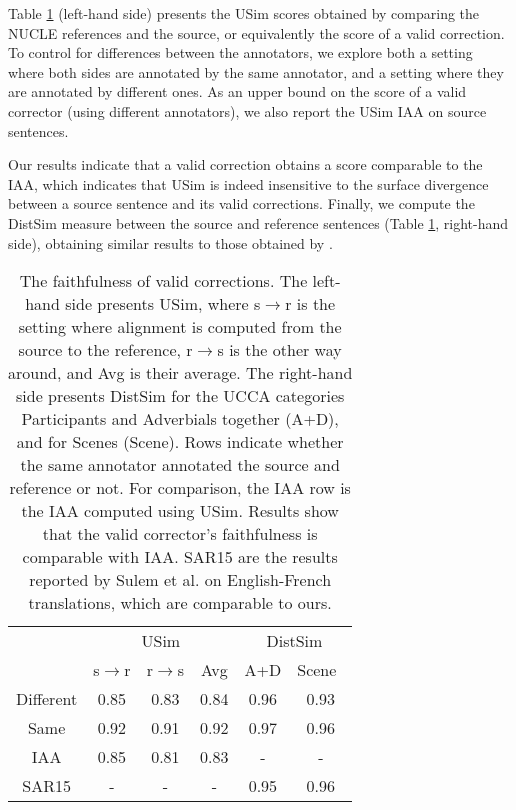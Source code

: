 \documentclass[a4paper, 11pt]{article}
\begin{document}
Table \ref{tab:Distances} (left-hand side) presents the {\sc USim} scores obtained by comparing 
the NUCLE references and the source, or equivalently the score of a valid correction.
To control for differences between the annotators, we explore both
a setting where both sides are annotated by the same annotator,
and a setting where they are annotated by different ones.
As an upper bound on the score of a valid corrector (using different annotators),
we also report the {\sc USim} IAA on source sentences. 

Our results indicate that a valid correction obtains a score comparable
to the IAA, which indicates that {\sc USim} is indeed
insensitive to the surface divergence between a source sentence and its valid corrections.
Finally, we compute the {\sc DistSim} measure
between the source and reference sentences (Table \ref{tab:Distances}, right-hand side),
obtaining similar results to those obtained by .

\begin{table}
	\vspace{-0.5cm}
  \small
  \centering
  \singlespacing
  \begin{tabular}{c|c|c|c||c|c|}
  	\cline{2-6} 
  	& \multicolumn{3}{c||}{\sc USim} & \multicolumn{2}{c|}{\sc DistSim}\\ \cline{2-6}
  	& s$\rightarrow$r & r$\rightarrow$s & Avg & A+D & Scene\
    \\
    \hline
    Different & 0.85 & 0.83 & 0.84 & 0.96 & 0.93
    \\
    Same & 0.92 & 0.91 & 0.92 & 0.97 & 0.96
    \\
    \hline
    \hline
    IAA & 0.85 & 0.81 & 0.83 & - & -
    \\
    \hline
    SAR15 & - & - & - & 0.95 & 0.96 \\
    \hline
  \end{tabular}
  \caption{\label{tab:Distances}
    The faithfulness of valid corrections.
    The left-hand side presents {\sc USim},
    where s$\rightarrow$r is the setting where alignment is computed from the source to the reference,
    r$\rightarrow$s is the other way around, and Avg is their average.
    The right-hand side presents {\sc DistSim} for the UCCA categories Participants and Adverbials
    together (A+D), and for Scenes (Scene).
    Rows indicate whether the same annotator annotated the source and reference or not.
    For comparison, the IAA row is the IAA computed using {\sc USim}.
    Results show that the valid corrector's faithfulness is comparable with IAA.
    SAR15 are the results reported by Sulem et al. on English-French
    translations, which are comparable to ours.}
\vspace{-0.6cm}
\end{table}
\end{document}
